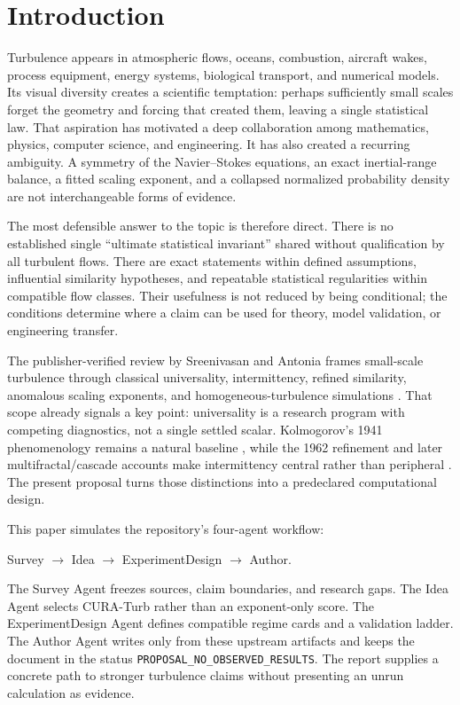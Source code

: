 \documentclass[conference]{../../../../Conference-LaTeX-template_10-17-19/IEEEtran}
\begin{document}
\section{Introduction}
Turbulence appears in atmospheric flows, oceans, combustion, aircraft wakes, process equipment, energy systems, biological transport, and numerical models. Its visual diversity creates a scientific temptation: perhaps sufficiently small scales forget the geometry and forcing that created them, leaving a single statistical law. That aspiration has motivated a deep collaboration among mathematics, physics, computer science, and engineering. It has also created a recurring ambiguity. A symmetry of the Navier--Stokes equations, an exact inertial-range balance, a fitted scaling exponent, and a collapsed normalized probability density are not interchangeable forms of evidence.

The most defensible answer to the topic is therefore direct. There is no established single ``ultimate statistical invariant'' shared without qualification by all turbulent flows. There are exact statements within defined assumptions, influential similarity hypotheses, and repeatable statistical regularities within compatible flow classes. Their usefulness is not reduced by being conditional; the conditions determine where a claim can be used for theory, model validation, or engineering transfer.

The publisher-verified review by Sreenivasan and Antonia frames small-scale turbulence through classical universality, intermittency, refined similarity, anomalous scaling exponents, and homogeneous-turbulence simulations \cite{sreenivasan_antonia_1997}. That scope already signals a key point: universality is a research program with competing diagnostics, not a single settled scalar. Kolmogorov's 1941 phenomenology remains a natural baseline \cite{kolmogorov_1941}, while the 1962 refinement and later multifractal/cascade accounts make intermittency central rather than peripheral \cite{kolmogorov_1962,frisch_1995}. The present proposal turns those distinctions into a predeclared computational design.

This paper simulates the repository's four-agent workflow:
\begin{center}
Survey $\rightarrow$ Idea $\rightarrow$ ExperimentDesign $\rightarrow$ Author.
\end{center}
The Survey Agent freezes sources, claim boundaries, and research gaps. The Idea Agent selects CURA-Turb rather than an exponent-only score. The ExperimentDesign Agent defines compatible regime cards and a validation ladder. The Author Agent writes only from these upstream artifacts and keeps the document in the status \texttt{PROPOSAL\_NO\_OBSERVED\_RESULTS}. The report supplies a concrete path to stronger turbulence claims without presenting an unrun calculation as evidence.
\end{document}
